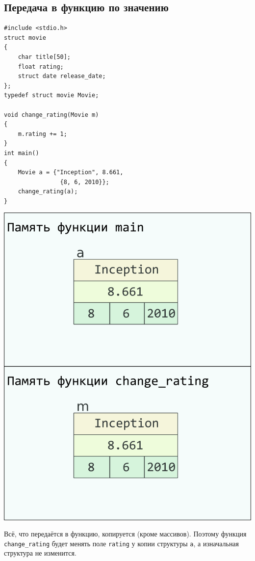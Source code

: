 \documentclass[10pt]{article}
\begin{document}
\subsection*{Передача в функцию по значению}
\begin{multicols}{2}
\begin{lstlisting}
#include <stdio.h>
struct movie 
{
    char title[50];
    float rating;
    struct date release_date;
};
typedef struct movie Movie;

void change_rating(Movie m) 
{
    m.rating += 1;
}
int main() 
{
    Movie a = {"Inception", 8.661, 
                {8, 6, 2010}};
    change_rating(a);
}
\end{lstlisting}
\columnbreak
\begin{center}
\includegraphics[scale=0.8]{../images/pointer_schemes/function_by_value.png}
\end{center}
\end{multicols}
Всё, что передаётся в функцию, копируется (кроме массивов). Поэтому функция \texttt{change\_rating} будет менять
поле \texttt{rating} у копии структуры \texttt{a}, а изначальная структура не изменится.
\end{document}
